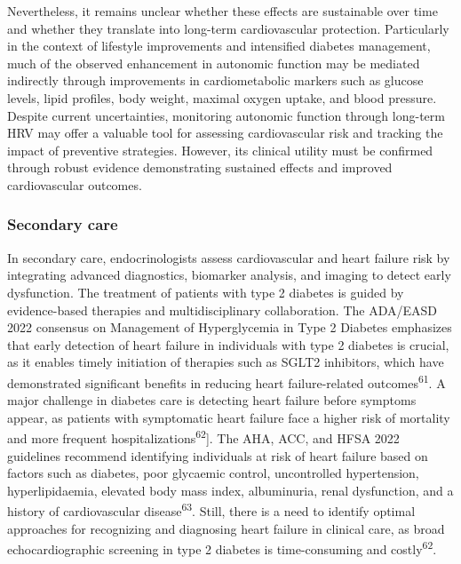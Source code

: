 \documentclass[
  a4paper,
  headsepline=true,
  open=any]{scrbook}
\begin{document}
Nevertheless, it remains unclear whether these effects are sustainable
over time and whether they translate into long-term cardiovascular
protection. Particularly in the context of lifestyle improvements and
intensified diabetes management, much of the observed enhancement in
autonomic function may be mediated indirectly through improvements in
cardiometabolic markers such as glucose levels, lipid profiles, body
weight, maximal oxygen uptake, and blood pressure. Despite current
uncertainties, monitoring autonomic function through long-term HRV may
offer a valuable tool for assessing cardiovascular risk and tracking the
impact of preventive strategies. However, its clinical utility must be
confirmed through robust evidence demonstrating sustained effects and
improved cardiovascular outcomes.

\hypertarget{secondary-care}{%
\subsubsection{Secondary care}\label{secondary-care}}

In secondary care, endocrinologists assess cardiovascular and heart
failure risk by integrating advanced diagnostics, biomarker analysis,
and imaging to detect early dysfunction. The treatment of patients with
type 2 diabetes is guided by evidence-based therapies and
multidisciplinary collaboration. The ADA/EASD 2022 consensus on
Management of Hyperglycemia in Type 2 Diabetes emphasizes that early
detection of heart failure in individuals with type 2 diabetes is
crucial, as it enables timely initiation of therapies such as SGLT2
inhibitors, which have demonstrated significant benefits in reducing
heart failure-related outcomes\textsuperscript{61}. A major challenge in
diabetes care is detecting heart failure before symptoms appear, as
patients with symptomatic heart failure face a higher risk of mortality
and more frequent hospitalizations\textsuperscript{62}{]}. The AHA, ACC,
and HFSA 2022 guidelines recommend identifying individuals at risk of
heart failure based on factors such as diabetes, poor glycaemic control,
uncontrolled hypertension, hyperlipidaemia, elevated body mass index,
albuminuria, renal dysfunction, and a history of cardiovascular
disease\textsuperscript{63}. Still, there is a need to identify optimal
approaches for recognizing and diagnosing heart failure in clinical
care, as broad echocardiographic screening in type 2 diabetes is
time-consuming and costly\textsuperscript{62}.
\end{document}
